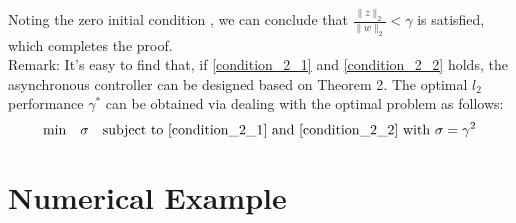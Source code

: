 \documentclass[conference]{IEEEtran}
\begin{document}
Noting the zero initial condition , we can conclude that $\frac{\|z\|_{2}}{\|w\|_2}<\gamma $ is satisfied, which completes the proof. \\
Remark: It's easy to find that, if \eqref{condition_2_1} and \eqref{condition_2_2} holds, the asynchronous controller can be designed based on Theorem 2. The optimal $l_2$ performance $\gamma^{*}$ can be obtained via dealing with the optimal problem as follows: \\ 
\begin{equation}
	\mathrm{min}\quad \sigma \quad \mathrm{subject \ to} \ \eqref{condition_2_1} \ \mathrm{and} \ \eqref{condition_2_2} \ \mathrm{with} \ \sigma=\gamma^{2} 
\end{equation}

\section{Numerical Example}
\end{document}
